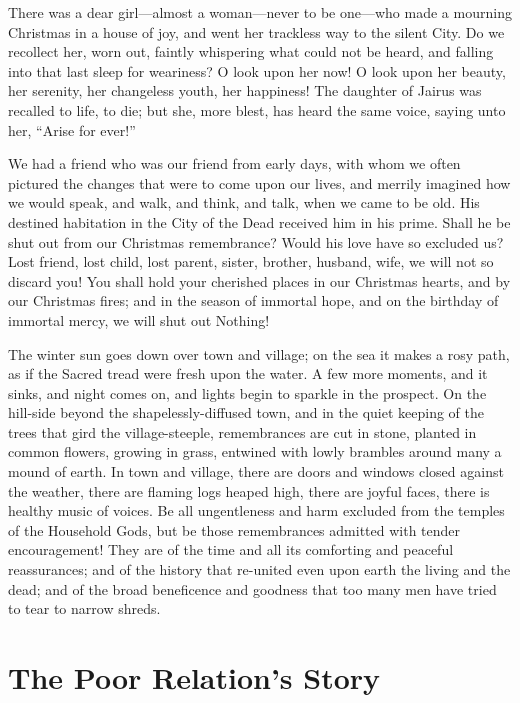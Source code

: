 There was a dear girl---almost a woman---never to be one---who made a
mourning Christmas in a house of joy, and went her trackless way to
the silent City.  Do we recollect her, worn out, faintly whispering
what could not be heard, and falling into that last sleep for
weariness?  O look upon her now!  O look upon her beauty, her
serenity, her changeless youth, her happiness!  The daughter of
Jairus was recalled to life, to die; but she, more blest, has heard
the same voice, saying unto her, ``Arise for ever!''

We had a friend who was our friend from early days, with whom we
often pictured the changes that were to come upon our lives, and
merrily imagined how we would speak, and walk, and think, and talk,
when we came to be old.  His destined habitation in the City of the
Dead received him in his prime.  Shall he be shut out from our
Christmas remembrance?  Would his love have so excluded us?  Lost
friend, lost child, lost parent, sister, brother, husband, wife, we
will not so discard you!  You shall hold your cherished places in
our Christmas hearts, and by our Christmas fires; and in the season
of immortal hope, and on the birthday of immortal mercy, we will
shut out Nothing!

The winter sun goes down over town and village; on the sea it makes
a rosy path, as if the Sacred tread were fresh upon the water.  A
few more moments, and it sinks, and night comes on, and lights begin
to sparkle in the prospect.  On the hill-side beyond the
shapelessly-diffused town, and in the quiet keeping of the trees
that gird the village-steeple, remembrances are cut in stone,
planted in common flowers, growing in grass, entwined with lowly
brambles around many a mound of earth.  In town and village, there
are doors and windows closed against the weather, there are flaming
logs heaped high, there are joyful faces, there is healthy music of
voices.  Be all ungentleness and harm excluded from the temples of
the Household Gods, but be those remembrances admitted with tender
encouragement!  They are of the time and all its comforting and
peaceful reassurances; and of the history that re-united even upon
earth the living and the dead; and of the broad beneficence and
goodness that too many men have tried to tear to narrow shreds.



\chapter{The Poor Relation's Story}



